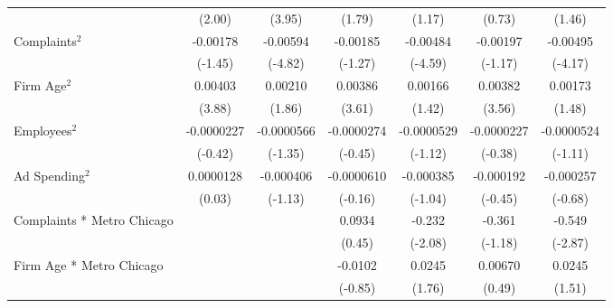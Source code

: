 {\begin{longtable}{l*{6}{c}}
                    &      (2.00)         &      (3.95)         &      (1.79)         &      (1.17)         &      (0.73)         &      (1.46)         \\
\addlinespace
Complaints$^{2}$    &    -0.00178         &    -0.00594\sym{***}&    -0.00185         &    -0.00484\sym{***}&    -0.00197         &    -0.00495\sym{***}\\
                    &     (-1.45)         &     (-4.82)         &     (-1.27)         &     (-4.59)         &     (-1.17)         &     (-4.17)         \\
\addlinespace
Firm Age$^{2}$      &     0.00403\sym{***}&     0.00210\sym{*}  &     0.00386\sym{***}&     0.00166         &     0.00382\sym{***}&     0.00173         \\
                    &      (3.88)         &      (1.86)         &      (3.61)         &      (1.42)         &      (3.56)         &      (1.48)         \\
\addlinespace
Employees$^{2}$     &  -0.0000227         &  -0.0000566         &  -0.0000274         &  -0.0000529         &  -0.0000227         &  -0.0000524         \\
                    &     (-0.42)         &     (-1.35)         &     (-0.45)         &     (-1.12)         &     (-0.38)         &     (-1.11)         \\
\addlinespace
Ad Spending$^{2}$   &   0.0000128         &   -0.000406         &  -0.0000610         &   -0.000385         &   -0.000192         &   -0.000257         \\
                    &      (0.03)         &     (-1.13)         &     (-0.16)         &     (-1.04)         &     (-0.45)         &     (-0.68)         \\
\addlinespace
Complaints * Metro Chicago&                     &                     &      0.0934         &      -0.232\sym{**} &      -0.361         &      -0.549\sym{***}\\
                    &                     &                     &      (0.45)         &     (-2.08)         &     (-1.18)         &     (-2.87)         \\
\addlinespace
Firm Age * Metro Chicago&                     &                     &     -0.0102         &      0.0245\sym{*}  &     0.00670         &      0.0245         \\
                    &                     &                     &     (-0.85)         &      (1.76)         &      (0.49)         &      (1.51)         \\

\end{longtable}}
